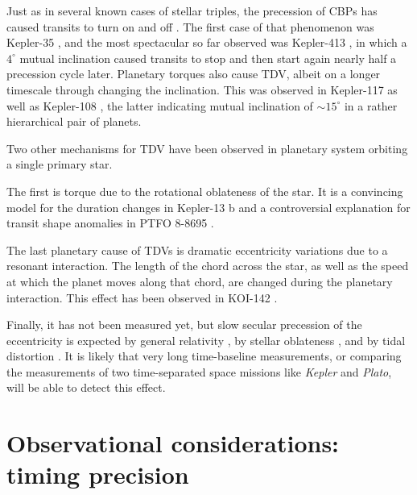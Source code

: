 \documentclass[graybox,natbib,nosecnum]{svmult}
\begin{document}
Just as in several known cases of stellar triples, the precession of CBPs has caused transits to turn on and off \citep{2017MNRAS.465.3235M}.  The first case of that phenomenon was Kepler-35 \citep{2012Natur.481..475W}, and the most spectacular so far observed was Kepler-413 \citep{2014ApJ...784...14K}, in which a $4^\circ$ mutual inclination caused transits to stop and then start again nearly half a precession cycle later.  Planetary torques also cause TDV, albeit on a longer timescale through changing the inclination.  This was observed in Kepler-117 \citep{2015MNRAS.453.2644A} as well as Kepler-108 \citep{1538-3881-153-1-45}, the latter indicating mutual inclination of $\sim 15^\circ$ in a rather hierarchical pair of planets. 

Two other mechanisms for TDV have been observed in planetary system orbiting a single primary star.

The first is torque due to the rotational oblateness of the star.  It is a convincing model for the duration changes in Kepler-13 b \citep[KOI 13.01][]{Szab2012} and a controversial explanation for transit shape anomalies in PTFO 8-8695 \citep{2013ApJ...774...53B}. 

The last planetary cause of TDVs is dramatic eccentricity variations due to a resonant interaction.  The length of the chord across the star, as well as the speed at which the planet moves along that chord, are changed during the planetary interaction.  This effect has been observed in KOI-142 \citep{2013ApJ...777....3N}.

Finally, it has not been measured yet, but slow secular precession of the eccentricity is expected by general relativity \citep{2008MNRAS.389..191P}, by stellar oblateness \citep{2007MNRAS.377.1511H}, and by tidal distortion \citep{2009ApJ...698.1778R}.  It is likely that very long time-baseline measurements, or comparing the measurements of two time-separated space missions like \emph{Kepler} and \emph{Plato}, will be able to detect this effect.

\section{Observational considerations: timing precision} %
\end{document}
